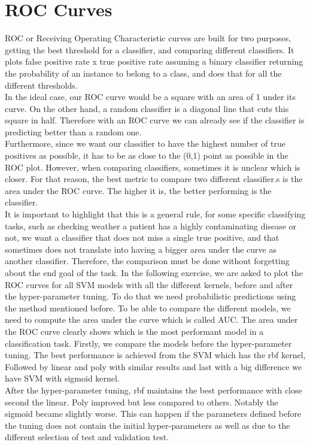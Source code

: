 \documentclass{thesisreport}
\begin{document}
\section{ROC Curves}
ROC or Receiving Operating Characteristic curves are built for two purposes, getting the best threshold for a classifier, and comparing different classifiers. It plots false positive rate x true positive rate assuming a binary classifier returning the probability of an instance to belong to a class, and does that for all the different thresholds.\\
In the ideal case, our ROC curve would be a square with an area of 1 under its curve. On the other hand, a random classifier is a diagonal line that cuts this square in half. Therefore with an ROC curve we can already see if the classifier is predicting better than a random one.\\ 
Furthermore, since we want our classifier to have the highest number of true positives as possible, it has to be as close to the (0,1) point as possible in the ROC plot. However, when comparing classifiers, sometimes it is unclear which is closer. For that reason, the best metric to compare two different classifier.s is the area under the ROC curve. The higher it is, the better performing is the classifier.\\
It is important to highlight that this is a general rule, for some specific classifying tasks, such as checking weather a patient has a highly contaminating disease or not, we want a classifier that does not miss a single true positive, and that sometimes does not translate into having a bigger area under the curve as another classifier. Therefore, the comparison must be done without forgetting about the end goal of the task. 
In the following exercise, we are asked to plot the ROC curves for all SVM models with all the different kernels, before and after the hyper-parameter tuning. To do that we need probabilistic predictions using the method mentioned before. To be able to compare the different models, we need to compute the area under the curve which is called AUC. The area under the ROC curve clearly shows which is the most performant model in a classification task.
Firstly, we compare the models before the hyper-parameter tuning. The best performance is achieved from the SVM which has the rbf kernel, Followed by linear and poly with similar results and last with a big difference we have SVM with sigmoid kernel.\\
After the hyper-parameter tuning, rbf maintains the best performance with close second the linear. Poly improved but less compared to others. Notably the sigmoid became slightly worse. This can happen if the parameters defined before the tuning does not contain the initial hyper-parameters as well as due to the different selection of test and validation test.
\end{document}
